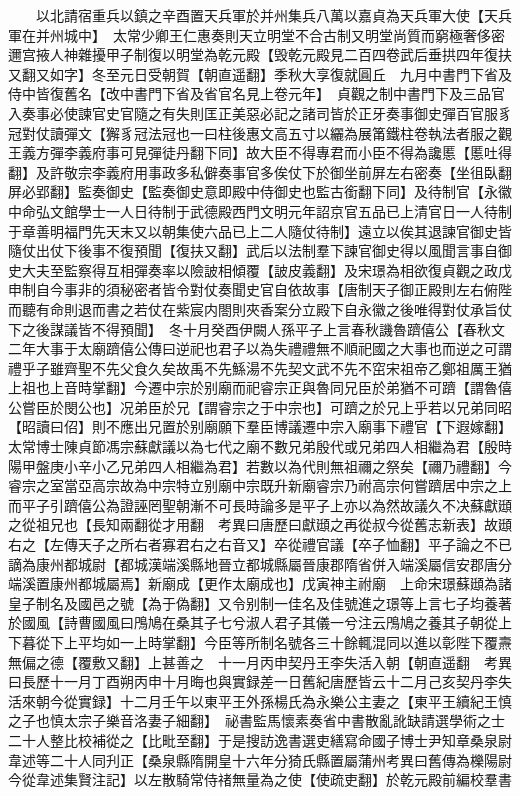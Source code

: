　　以北請宿重兵以鎮之辛酉置天兵軍於并州集兵八萬以嘉貞為天兵軍大使【天兵軍在并州城中】　太常少卿王仁惠奏則天立明堂不合古制又明堂尚質而窮極奢侈密邇宫掖人神雜擾甲子制復以明堂為乾元殿【毁乾元殿見二百四卷武后垂拱四年復扶又翻又如字】冬至元日受朝賀【朝直遥翻】季秋大享復就圓丘　九月中書門下省及侍中皆復舊名【改中書門下省及省官名見上卷元年】　貞觀之制中書門下及三品官入奏事必使諫官史官隨之有失則匡正美惡必記之諸司皆於正牙奏事御史彈百官服豸冠對仗讀彈文【獬豸冠法冠也一曰柱後惠文高五寸以纚為展筩鐵柱卷執法者服之觀王義方彈李義府事可見彈徒丹翻下同】故大臣不得專君而小臣不得為讒慝【慝吐得翻】及許敬宗李義府用事政多私僻奏事官多俟仗下於御坐前屏左右密奏【坐徂臥翻屏必郢翻】監奏御史【監奏御史意即殿中侍御史也監古銜翻下同】及待制官【永徽中命弘文館學士一人日待制于武德殿西門文明元年詔京官五品已上清官日一人待制于章善明福門先天末又以朝集使六品已上二人隨仗待制】遠立以俟其退諫官御史皆隨仗出仗下後事不復預聞【復扶又翻】武后以法制羣下諫官御史得以風聞言事自御史大夫至監察得互相彈奏率以險詖相傾覆【詖皮義翻】及宋璟為相欲復貞觀之政戊申制自今事非的須秘密者皆令對仗奏聞史官自依故事【唐制天子御正殿則左右俯陛而聽有命則退而書之若仗在紫宸内閤則夾香案分立殿下自永徽之後唯得對仗承旨仗下之後謀議皆不得預聞】　冬十月癸酉伊闕人孫平子上言春秋譏魯躋僖公【春秋文二年大事于太廟躋僖公傳曰逆祀也君子以為失禮禮無不順祀國之大事也而逆之可謂禮乎子雖齊聖不先父食久矣故禹不先鯀湯不先契文武不先不窋宋祖帝乙鄭祖厲王猶上祖也上音時掌翻】今遷中宗於别廟而祀睿宗正與魯同兄臣於弟猶不可躋【謂魯僖公嘗臣於閔公也】况弟臣於兄【謂睿宗之于中宗也】可躋之於兄上乎若以兄弟同昭【昭讀曰佋】則不應出兄置於别廟願下羣臣博議遷中宗入廟事下禮官【下遐嫁翻】太常博士陳貞節馮宗蘇獻議以為七代之廟不數兄弟殷代或兄弟四人相繼為君【殷時陽甲盤庚小辛小乙兄弟四人相繼為君】若數以為代則無祖禰之祭矣【禰乃禮翻】今睿宗之室當亞高宗故為中宗特立别廟中宗既升新廟睿宗乃祔高宗何嘗躋居中宗之上而平子引躋僖公為證誣罔聖朝漸不可長時論多是平子上亦以為然故議久不决蘇獻頲之從祖兄也【長知兩翻從才用翻　考異曰唐歷曰獻頲之再從叔今從舊志新表】故頲右之【左傳天子之所右者寡君右之右音又】卒從禮官議【卒子恤翻】平子論之不已謫為康州都城尉【都城漢端溪縣地晉立都城縣屬晉康郡隋省併入端溪屬信安郡唐分端溪置康州都城屬焉】新廟成【更作太廟成也】戊寅神主祔廟　上命宋璟蘇頲為諸皇子制名及國邑之號【為于偽翻】又令别制一佳名及佳號進之璟等上言七子均養著於國風【詩曹國風曰鳲鳩在桑其子七兮淑人君子其儀一兮注云鳲鳩之養其子朝從上下暮從下上平均如一上時掌翻】今臣等所制名號各三十餘輒混同以進以彰陛下覆燾無偏之德【覆敷又翻】上甚善之　十一月丙申契丹王李失活入朝【朝直遥翻　考異曰長歷十一月丁酉朔丙申十月晦也與實録差一日舊紀唐歷皆云十二月己亥契丹李失活來朝今從實録】十二月壬午以東平王外孫楊氏為永樂公主妻之【東平王續紀王慎之子也慎太宗子樂音洛妻子細翻】　祕書監馬懷素奏省中書散亂訛缺請選學術之士二十人整比校補從之【比毗至翻】于是搜訪逸書選吏繕寫命國子博士尹知章桑泉尉韋述等二十人同刋正【桑泉縣隋開皇十六年分猗氏縣置屬蒲州考異曰舊傳為櫟陽尉今從韋述集賢注記】以左散騎常侍禇無量為之使【使疏吏翻】於乾元殿前編校羣書


